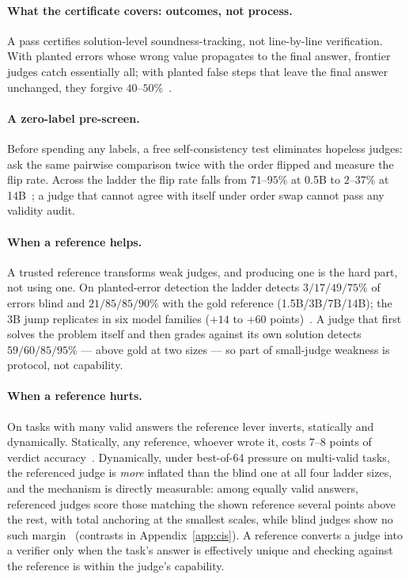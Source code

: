 \paragraph{What the certificate covers: outcomes, not process.}
A pass certifies solution-level soundness-tracking, not line-by-line verification.
With planted errors whose wrong value propagates to the final answer, frontier judges catch essentially all; with planted false steps that leave the final answer unchanged, they forgive $40$--$50\%$~\cite{companionB}.

\paragraph{A zero-label pre-screen.}
Before spending any labels, a free self-consistency test eliminates hopeless judges: ask the same pairwise comparison twice with the order flipped and measure the flip rate.
Across the ladder the flip rate falls from $71$--$95\%$ at 0.5B to $2$--$37\%$ at 14B~\cite{companionB}; a judge that cannot agree with itself under order swap cannot pass any validity audit.

\paragraph{When a reference helps.}
A trusted reference transforms weak judges, and producing one is the hard part, not using one.
On planted-error detection the ladder detects $3/17/49/75\%$ of errors blind and $21/85/85/90\%$ with the gold reference (1.5B/3B/7B/14B); the 3B jump replicates in six model families ($+14$ to $+60$ points)~\cite{companionB}.
A judge that first solves the problem itself and then grades against its own solution detects $59/60/85/95\%$ --- above gold at two sizes --- so part of small-judge weakness is protocol, not capability.

\paragraph{When a reference hurts.}
On tasks with many valid answers the reference lever inverts, statically and dynamically.
Statically, any reference, whoever wrote it, costs $7$--$8$ points of verdict accuracy~\cite{companionD}.
Dynamically, under best-of-64 pressure on multi-valid tasks, the referenced judge is \emph{more} inflated than the blind one at all four ladder sizes, and the mechanism is directly measurable: among equally valid answers, referenced judges score those matching the shown reference several points above the rest, with total anchoring at the smallest scales, while blind judges show no such margin~\cite{companionD} (contrasts in Appendix~\ref{app:cis}).
A reference converts a judge into a verifier only when the task's answer is effectively unique and checking against the reference is within the judge's capability.
